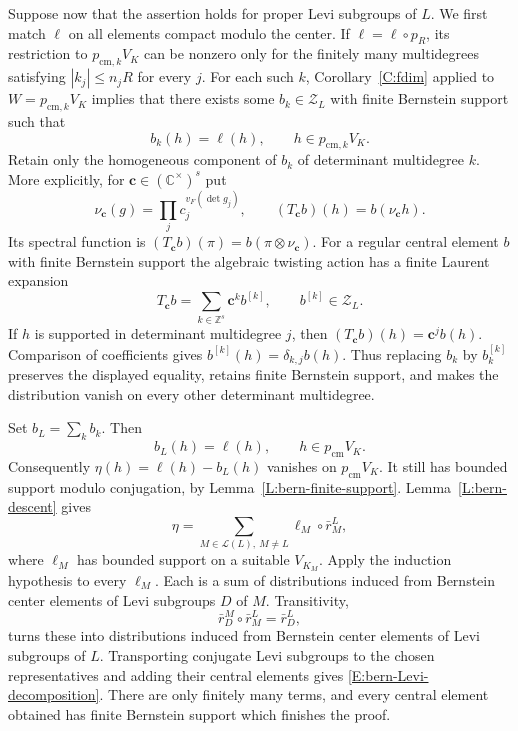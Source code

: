 \documentclass[11pt,a4paper]{amsart}
\newcommand{\mcZ}{\mathcal Z}
\theoremstyle{definition}
\theoremstyle{remark}
\begin{document}
Suppose now that the assertion holds for proper Levi subgroups of $L$.
We first match $\ell$ on all elements compact modulo the center.
If $\ell=\ell\circ p_R$, its restriction to
$p_{\mathrm{cm},k}V_K$ can be nonzero only for the finitely many
multidegrees satisfying $|k_j|\leq n_jR$ for every $j$.
For each such $k$, Corollary~\ref{C:fdim} applied to $W=p_{\mathrm{cm},k}V_K$ implies that there exists some 
$b_k\in\mcZ_L$ with finite Bernstein support such that
$$
 b_k(h)=\ell(h),\qquad
 h\in p_{\mathrm{cm},k}V_K.
$$
Retain only the homogeneous component of $b_k$ of determinant
multidegree $k$. More explicitly, for $\mathbf c\in(\mathbb C^\times)^s$
put
$$
 \nu_{\mathbf c}(g)=\prod_j c_j^{v_F(\det g_j)},\qquad
 (T_{\mathbf c}b)(h)=b(\nu_{\mathbf c}h).
$$
Its spectral function is $(T_{\mathbf c}b)(\pi)
=b(\pi\otimes\nu_{\mathbf c})$. For a regular central element
$b$ with finite Bernstein support the algebraic twisting action
has a finite Laurent expansion
$$
 T_{\mathbf c}b=\sum_{k\in\mathbb Z^s}\mathbf c^k b^{[k]},
 \qquad b^{[k]}\in\mcZ_L.
$$
If $h$ is supported in determinant multidegree $j$, then
$(T_{\mathbf c}b)(h)=\mathbf c^j b(h)$.
Comparison of coefficients gives
$b^{[k]}(h)=\delta_{k,j}b(h)$.
Thus replacing $b_k$ by $b_k^{[k]}$ preserves the displayed equality,
retains finite Bernstein support, and makes the distribution vanish
on every other determinant multidegree.

Set $b_L=\sum_k b_k$. Then
$$
 b_L(h)=\ell(h),\qquad h\in p_{\mathrm{cm}}V_K.
$$
Consequently
$\eta(h)=\ell(h)-b_L(h)$ vanishes on
$p_{\mathrm{cm}}V_K$. It still has bounded support modulo conjugation,
by Lemma~\ref{L:bern-finite-support}. Lemma~\ref{L:bern-descent} gives
$$
 \eta=\sum_{M\in\mathcal L(L),\ M\ne L}
             \ell_M\circ\bar r_M^L,
$$
where $\ell_M$ has bounded support on a suitable $V_{K_M}$.
Apply the induction hypothesis to every $\ell_M$. Each is a sum of
distributions induced from Bernstein center elements of Levi subgroups $D$ of $M$. Transitivity,
$$
 \bar r_D^M\circ\bar r_M^L=\bar r_D^L,
$$
turns these into distributions induced from Bernstein center elements of Levi subgroups of $L$.
Transporting conjugate Levi subgroups to the chosen representatives
and adding their central elements gives
\eqref{E:bern-Levi-decomposition}. There are only finitely many terms,
and every central element obtained has finite Bernstein support which finishes the proof.
\end{document}
